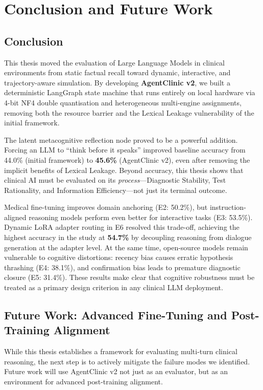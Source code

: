 \chapter{Conclusion and Future Work}
\label{Chapter8}

\section{Conclusion}

This thesis moved the evaluation of Large Language Models in clinical environments from static factual recall toward dynamic, interactive, and trajectory-aware simulation. By developing \textbf{AgentClinic v2}, we built a deterministic LangGraph state machine that runs entirely on local hardware via 4-bit NF4 double quantisation and heterogeneous multi-engine assignments, removing both the resource barrier and the Lexical Leakage vulnerability of the initial framework.

The latent metacognitive reflection node proved to be a powerful addition. Forcing an LLM to ``think before it speaks'' improved baseline accuracy from 44.0\% (initial framework) to \textbf{45.6\%} (AgentClinic v2), even after removing the implicit benefits of Lexical Leakage. Beyond accuracy, this thesis shows that clinical AI must be evaluated on its \textit{process}---Diagnostic Stability, Test Rationality, and Information Efficiency---not just its terminal outcome.

Medical fine-tuning improves domain anchoring (E2: 50.2\%), but instruction-aligned reasoning models perform even better for interactive tasks (E3: 53.5\%). Dynamic LoRA adapter routing in E6 resolved this trade-off, achieving the highest accuracy in the study at \textbf{54.7\%} by decoupling reasoning from dialogue generation at the adapter level. At the same time, open-source models remain vulnerable to cognitive distortions: recency bias causes erratic hypothesis thrashing (E4: 38.1\%), and confirmation bias leads to premature diagnostic closure (E5: 31.4\%). These results make clear that cognitive robustness must be treated as a primary design criterion in any clinical LLM deployment.

\section{Future Work: Advanced Fine-Tuning and Post-Training Alignment}

While this thesis establishes a framework for evaluating multi-turn clinical reasoning, the next step is to actively mitigate the failure modes we identified. Future work will use AgentClinic v2 not just as an evaluator, but as an environment for advanced post-training alignment.

